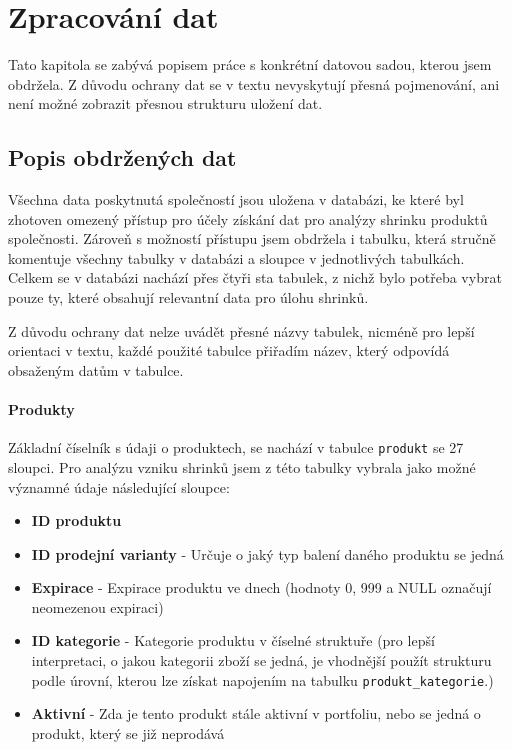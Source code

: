 \chapter{Zpracování dat}

Tato kapitola se zabývá popisem práce s konkrétní datovou sadou, kterou jsem obdržela. Z důvodu ochrany dat se v textu nevyskytují přesná pojmenování, ani není možné zobrazit přesnou strukturu uložení dat. 

\section{Popis obdržených dat}

Všechna data poskytnutá společností jsou uložena v databázi, ke které byl zhotoven omezený přístup pro účely získání dat pro analýzy shrinku produktů společnosti. Zároveň s možností přístupu jsem obdržela i tabulku, která stručně komentuje všechny tabulky v databázi a sloupce v jednotlivých tabulkách. Celkem se v databázi nachází přes čtyři sta tabulek, z nichž bylo potřeba vybrat pouze ty, které obsahují relevantní data pro úlohu shrinků.

Z důvodu ochrany dat nelze uvádět přesné názvy tabulek, nicméně pro lepší orientaci v textu, každé použité tabulce přiřadím název, který odpovídá obsaženým datům v tabulce.

\subsubsection{Produkty}

Základní číselník s údaji o produktech, se nachází v tabulce \texttt{produkt} se 27 sloupci. Pro analýzu vzniku shrinků jsem z této tabulky vybrala jako možné významné údaje následující sloupce:

\begin{itemize}
    \itemsep0em 
    \item \textbf{ID produktu}
    \item \textbf{ID prodejní varianty} - Určuje o jaký typ balení daného produktu se jedná    
    \item \textbf{Expirace} - Expirace produktu ve dnech (hodnoty 0, 999 a NULL označují neomezenou expiraci)
    \item \textbf{ID kategorie} - Kategorie produktu v číselné struktuře (pro lepší interpretaci, o jakou kategorii zboží se jedná, je vhodnější použít strukturu podle úrovní, kterou lze získat napojením na tabulku \texttt{produkt\_kategorie}.)
    \item \textbf{Aktivní} -  Zda je tento produkt stále aktivní v portfoliu, nebo se jedná o produkt, který se již neprodává
\end{itemize}

